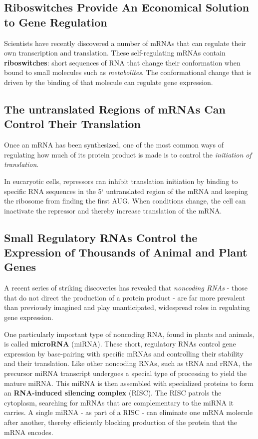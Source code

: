 \subsection{Riboswitches Provide An Economical Solution to Gene Regulation}

Scientists have recently discovered a number of mRNAs that can regulate their
own transcription and translation. These self-regulating mRNAs contain
\textbf{riboswitches}: short sequences of RNA that change their conformation
when bound to small molecules such as \textit{metabolites}.
The conformational change that is driven by the binding of that molecule
can regulate gene expression.

\subsection{The untranslated Regions of mRNAs Can Control Their Translation}

Once an mRNA has been synthesized, one of the most common ways of
regulating how much of its protein product is made is to control the \textit{initiation of translation}.

In eucaryotic cells, repressors can inhibit translation initiation by binding
to specific RNA sequences in the 5` untranslated region of the mRNA
and keeping the ribosome from finding the first AUG. When conditions
change, the cell can inactivate the repressor and thereby increase translation of the mRNA.

\subsection{Small Regulatory RNAs Control the Expression of Thousands of Animal and Plant Genes}

A recent series of striking discoveries has revealed
that \textit{noncoding RNAs} - those that do not direct the production of a protein
product - are far more prevalent than previously imagined and play
unanticipated, widespread roles in regulating gene expression.

One particularly important type of noncoding RNA, found in plants and
animals, is called \textbf{microRNA} (miRNA). These short, regulatory RNAs control
gene expression by base-pairing with specific mRNAs and controlling
their stability and their translation.
Like other noncoding RNAs, such as tRNA and rRNA, the precursor
miRNA transcript undergoes a special type of processing to yield the
mature miRNA. This miRNA is then assembled with specialized proteins
to form an \textbf{RNA-induced silencing complex} (RISC). The RISC patrols the
cytoplasm, searching for mRNAs that are complementary to the miRNA
it carries. A single miRNA - as part of a RISC -
can eliminate one mRNA molecule after another, thereby efficiently
blocking production of the protein that the mRNA encodes.


